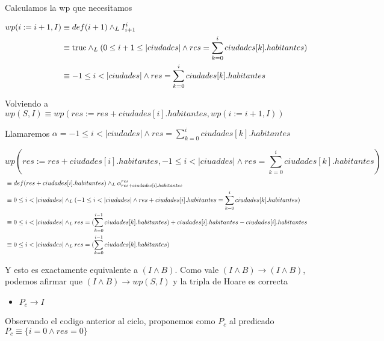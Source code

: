 \documentclass[10pt,a4paper]{article}
\begin{document}
\begin {enumerate}
    Calculamos la wp que necesitamos

    \begin{align*}
        wp (i := i + 1, I) &\equiv def(i + 1) \land _L I_{i +1}^{i} \\
        &\equiv \mathrm{true} \land _L (0 \leq i + 1 \leq |ciudades| \land res = \sum\limits_{k=0}^{i}{ciudades[k].habitantes}) \\
        &\equiv -1 \leq i < |ciudades| \land res =  \sum\limits_{k=0}^{i}{ciudades[k].habitantes} 
    \end{align*}

    Volviendo a $wp(S, I) \equiv wp(res := res + ciudades[i].habitantes, wp(i := i + 1, I))$

    Llamaremos $\alpha = -1 \leq i < |ciudades| \land res =  \sum\limits_{k=0}^{i}{ciudades[k].habitantes} $

    $$ wp(res := res + ciudades[i].habitantes, -1 \leq i < |ciuaddes| \land res =  \sum\limits_{k=0}^{i}{ciudades[k].habitantes}) $$
    \begin{align*}
        &\equiv def(res + ciudades[i].habitantes) \land _L \alpha_{res + ciudades[i].habitantes}^{res} \\
        &\equiv 0 \leq i < |ciudades| \land _L (-1 \leq i < |ciudades| \land res + ciudades[i].habitantes = \sum\limits_{k=0}^{i}{ciudades[k].habitantes} ) \\
        &\equiv 0 \leq i < |ciudades| \land _L res = (\sum\limits_{k=0}^{i - 1}{ciudades[k].habitantes}) + ciudades[i].habitantes - ciudades[i].habitantes \\
        &\equiv 0 \leq i < |ciudades| \land _L res = (\sum\limits_{k=0}^{i - 1}{ciudades[k].habitantes})  \\
    \end{align*}

    Y esto es exactamente equivalente a $(I \land B)$. Como vale $(I \land B) \to (I \land B)$, podemos afirmar que $(I \land B) \to wp(S, I)$ y la tripla de Hoare es correcta


    \begin{itemize}
        \item $ P_{c} \to I$
        \end{itemize}

    Observando el codigo anterior al ciclo, proponemos como $P_{c}$ al predicado $P_{c} \equiv \{i = 0 \land res = 0\}$


\end{enumerate}
\end{document}
